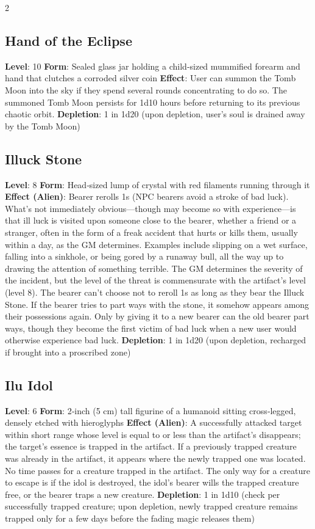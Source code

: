 \begin{multicols}{2}
\subsection{Hand of the Eclipse }
\textbf{Level}: 10 
\textbf{Form}: Sealed glass jar holding a child‑sized mummified forearm and hand that clutches a corroded silver coin 
\textbf{Effect}: User can summon the Tomb Moon into the sky if they spend several rounds concentrating to do so. The summoned Tomb Moon persists for 1d10 hours before returning to its previous chaotic orbit. 
\textbf{Depletion}: 1 in 1d20 (upon depletion, user’s soul is drained away by the Tomb Moon) 

\subsection{Illuck Stone}
\textbf{Level}: 8 
\textbf{Form}: Head‑sized lump of crystal with red filaments running through it 
\textbf{Effect (Alien)}: Bearer rerolls 1s (NPC bearers avoid a stroke of bad luck). 
What’s not immediately obvious—though may become so with experience—is that ill luck is visited upon someone close to the bearer, whether a friend or a stranger, often in the form of a freak accident that hurts or kills them, usually within a day, as the GM determines. Examples include slipping on a wet surface, falling into a sinkhole, or being gored by a runaway bull, all the way up to drawing the attention of something terrible. The GM determines the severity of the incident, but the level of the threat is commensurate with the artifact’s level (level 8). 
The bearer can’t choose not to reroll 1s as long as they bear the Illuck Stone. If the bearer tries to part ways with the stone, it somehow appears among their possessions again. Only by giving it to a new bearer can the old bearer part ways, though they become the first victim of bad luck when a new user would otherwise experience bad luck. 
\textbf{Depletion}: 1 in 1d20 (upon depletion, recharged if brought into a proscribed zone) 

\subsection{Ilu Idol}
\textbf{Level}: 6 
\textbf{Form}: 2‑inch (5 cm) tall figurine of a humanoid sitting cross‑legged, densely etched with hieroglyphs 
\textbf{Effect (Alien)}: A successfully attacked target within short range whose level is equal to or less than the artifact’s disappears; the target’s essence is trapped in the artifact. If a previously trapped creature was already in the artifact, it appears where the newly trapped one was located. 
No time passes for a creature trapped in the artifact. The only way for a creature to escape is if the idol is destroyed, the idol’s bearer wills the trapped creature free, or the bearer traps a new creature. 
\textbf{Depletion}: 1 in 1d10 (check per successfully trapped creature; upon depletion, newly trapped creature remains trapped only for a few days before the fading magic releases them)


\end{multicols}
